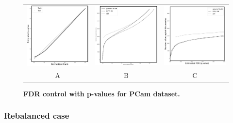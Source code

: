 \documentclass{article}
\begin{document}
\begin{figure}
	\centering
	\begin{tabular}{ccc}
 		\includegraphics[width=2in]{img/pcam_QQ.png} &
		\includegraphics[width=2in]{img/pcam_fdr_control.png} & 
            \includegraphics[width=2in]{img/pcam_fdr_control_loc.png}
		\\	
		A & B & C
	\end{tabular}
	\caption{\bf FDR control with p-values for PCam dataset.}
	\label{fig:pcam}
\end{figure} 

\subsubsection{Rebalanced case}
\end{document}
